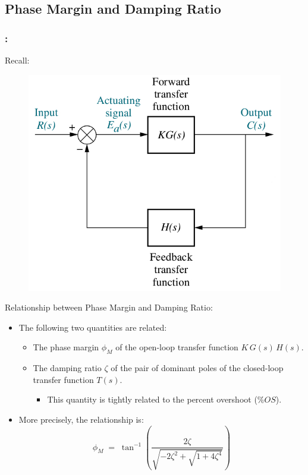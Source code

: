 \documentclass[ 10pt, xcolor = dvipsnames]{beamer}
\begin{document}
\subsection{Phase Margin and Damping Ratio}

\begin{frame}[allowframebreaks]
\frametitle{\insertsection: \insertsubsection}

Recall: 
\begin{figure}
\centering
\includegraphics[width=0.5\columnwidth]{figures/Nise_Fig-8-1-a.jpg}
\end{figure}
\framebreak

Relationship between Phase Margin and Damping Ratio: 
\begin{itemize}
\item The following two quantities are related: 
\begin{itemize}
\item The phase margin $\phi_M$ of the open-loop transfer function $K \, G(s) \, H(s)$. 
\item The damping ratio $\zeta$ of the pair of dominant poles of the closed-loop \linebreak transfer function $T(s)$. 
\begin{itemize}
\item This quantity is tightly related to the percent overshoot ($\% OS$). 
\end{itemize}

\end{itemize}
\item More precisely, the relationship is: 
\[
\phi_M \; = \; \tan^{-1} \left(
\frac{2 \zeta}{ \sqrt{ -2 \zeta^2 + \sqrt{1 + 4 \zeta^4} } }
\right)
\]
\end{itemize}

\end{frame}
\end{document}
